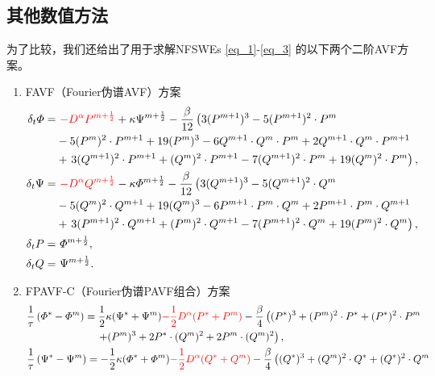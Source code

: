 \subsection{其他数值方法}
为了比较，我们还给出了用于求解NFSWEs \eqref{eq_1}-\eqref{eq_3} 的以下两个二阶AVF方案。
\begin{enumerate}[$\bullet$]
\item FAVF（Fourier伪谱AVF）方案
\begin{align}
\delta_{t} \varPhi =&~\textcolor[rgb]{1.00,0.00,0.00}{-D^{\alpha} P^{m+\frac{1}{2}}}+\kappa \Psi^{m+\frac{1}{2}}-\frac{\beta}{12}\left(3 (P^{m+1})^3-5 (P^{m+1})^2\cdot P^{m}\right.\nonumber\\
		&-5 (P^{m})^2\cdot P^{m+1}+19 (P^{m})^3-6 Q^{m+1}\cdot Q^{m}\cdot P^{m}+2 Q^{m+1}\cdot Q^{m}\cdot P^{m+1} \nonumber\\
		&+\left. 3 (Q^{m+1})^2\cdot P^{m+1}+(Q^{m})^2\cdot P^{m+1}-7 (Q^{m+1})^2\cdot P^{m}+19 (Q^{m} )^2\cdot P^{m}\right),\label{eq_66}\\
\delta_{t} \Psi =&~\textcolor[rgb]{1.00,0.00,0.00}{-D^{\alpha} Q^{m+\frac{1}{2}}}-\kappa \varPhi^{m+\frac{1}{2}}-\frac{\beta}{12}\left(3 (Q^{m+1})^3-5 (Q^{m+1})^2\cdot Q^{m}\right.\nonumber\\
		&-5 (Q^{m})^2\cdot Q^{m+1}+19 (Q^{m})^3-6 P^{m+1}\cdot P^{m}\cdot Q^{m}+2 P^{m+1}\cdot P^{m}\cdot Q^{m+1} \nonumber\\
		&+\left. 3 (P^{m+1})^2\cdot Q^{m+1}+(P^{m})^2\cdot Q^{m+1}-7 (P^{m+1})^2\cdot Q^{m}+19 (P^{m} )^2\cdot Q^{m}\right),\label{eq_67}\\
\delta_{t} P=&~\varPhi^{m+\frac{1}{2}},\label{eq_68}\\
\delta_{t} Q=&~\Psi^{m+\frac{1}{2}}.\label{eq_69}
\end{align}
\item FPAVF-C（Fourier伪谱PAVF组合）方案
\begin{align}
&\frac{1}{\tau}\left(\varPhi^{*}-\varPhi^{m}\right)=\frac{1}{2}\kappa(\Psi^{*}+\Psi^{m})\textcolor[rgb]{1.00,0.00,0.00}{-\frac{1}{2}D^{\alpha} (P^{*}+P^{m})}-\frac{\beta}{4}\left( (P^{*})^3+ (P^{m})^{2}\cdot P^{*}+(P^{*})^{2}\cdot P^{m}\right.\nonumber\\
		&~~~~~~~~~~~~~~~~~~~~\left.+ (P^{m})^{3}+2 P^{*}\cdot (Q^{m})^{2}+2 P^{m}\cdot (Q^{m})^{2}\right),\label{eq_90}\\
&\frac{1}{\tau}\left(\Psi^{*}-\Psi^{m}\right)=-\frac{1}{2}\kappa (\varPhi^{*}+\varPhi^{m})\textcolor[rgb]{1.00,0.00,0.00}{-\frac{1}{2}D^{\alpha} (Q^{*}+Q^{m})}-\frac{\beta}{4}\left( (Q^{*})^3+ (Q^{m})^{2}\cdot Q^{*}+ (Q^{*})^{2}\cdot Q^{m}\right.\nonumber\\

\end{align}
\end{enumerate}
